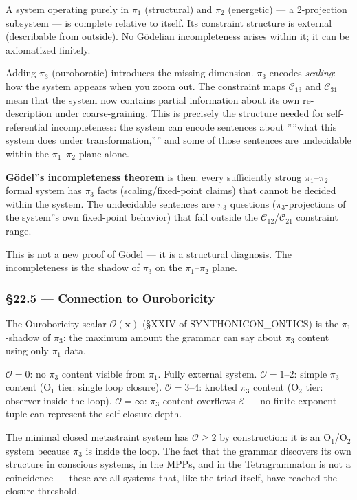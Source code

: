 \documentclass[12pt,a4paper]{article}
\newcommand{\pilcrow}{\S}
\begin{document}
A system operating purely in $\pi_1$ (structural) and $\pi_2$ (energetic) --- a 2-projection subsystem --- is complete relative to itself. Its constraint structure is external (describable from outside). No Gödelian incompleteness arises within it; it can be axiomatized finitely.

Adding $\pi_3$ (ouroborotic) introduces the missing dimension. $\pi_3$ encodes \emph{scaling}: how the system appears when you zoom out. The constraint maps $\mathcal{C}_{13}$ and $\mathcal{C}_{31}$ mean that the system now contains partial information about its own re-description under coarse-graining. This is precisely the structure needed for self-referential incompleteness: the system can encode sentences about ''''what this system does under transformation,'''' and some of those sentences are undecidable within the $\pi_1$--$\pi_2$ plane alone.

\textbf{Gödel''s incompleteness theorem} is then: every sufficiently strong $\pi_1$--$\pi_2$ formal system has $\pi_3$ facts (scaling/fixed-point claims) that cannot be decided within the system. The undecidable sentences are $\pi_3$ questions ($\pi_3$-projections of the system''s own fixed-point behavior) that fall outside the $\mathcal{C}_{12}$/$\mathcal{C}_{21}$ constraint range.

This is not a new proof of Gödel --- it is a structural diagnosis. The incompleteness is the shadow of $\pi_3$ on the $\pi_1$--$\pi_2$ plane.

\subsubsection{\pilcrow{}22.5 --- Connection to Ouroboricity}

The Ouroboricity scalar $\mathcal{O}(\mathbf{x})$ (\pilcrow{}XXIV of SYNTHONICON\_ONTICS) is the $\pi_1$-shadow of $\pi_3$: the maximum amount the grammar can say about $\pi_3$ content using only $\pi_1$ data.

$\mathcal{O} = 0$: no $\pi_3$ content visible from $\pi_1$. Fully external system.
$\mathcal{O} = 1$--$2$: simple $\pi_3$ content (O$_1$ tier: single loop closure).
$\mathcal{O} = 3$--$4$: knotted $\pi_3$ content (O$_2$ tier: observer inside the loop).
$\mathcal{O} = \infty$: $\pi_3$ content overflows $\mathcal{E}$ --- no finite exponent tuple can represent the self-closure depth.

The minimal closed metastraint system has $\mathcal{O} \geq 2$ by construction: it is an O$_1$/O$_2$ system because $\pi_3$ is inside the loop. The fact that the grammar discovers its own structure in conscious systems, in the MPPs, and in the Tetragrammaton is not a coincidence --- these are all systems that, like the triad itself, have reached the closure threshold.
\end{document}
